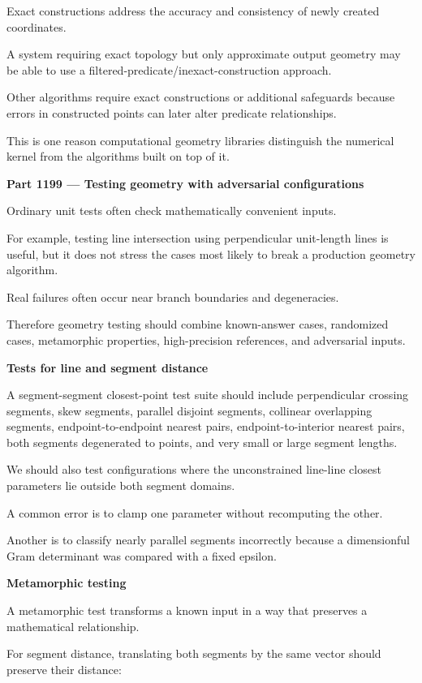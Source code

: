 Exact constructions address the accuracy and consistency of newly created coordinates.

A system requiring exact topology but only approximate output geometry may be able to use a filtered-predicate/inexact-construction approach.

Other algorithms require exact constructions or additional safeguards because errors in constructed points can later alter predicate relationships.

This is one reason computational geometry libraries distinguish the numerical kernel from the algorithms built on top of it.

\textbf{Part 1199 --- Testing geometry with adversarial configurations}

Ordinary unit tests often check mathematically convenient inputs.

For example, testing line intersection using perpendicular unit-length lines is useful, but it does not stress the cases most likely to break a production geometry algorithm.

Real failures often occur near branch boundaries and degeneracies.

Therefore geometry testing should combine known-answer cases, randomized cases, metamorphic properties, high-precision references, and adversarial inputs.

\textbf{Tests for line and segment distance}

A segment-segment closest-point test suite should include perpendicular crossing segments, skew segments, parallel disjoint segments, collinear overlapping segments, endpoint-to-endpoint nearest pairs, endpoint-to-interior nearest pairs, both segments degenerated to points, and very small or large segment lengths.

We should also test configurations where the unconstrained line-line closest parameters lie outside both segment domains.

A common error is to clamp one parameter without recomputing the other.

Another is to classify nearly parallel segments incorrectly because a dimensionful Gram determinant was compared with a fixed epsilon.

\textbf{Metamorphic testing}

A metamorphic test transforms a known input in a way that preserves a mathematical relationship.

For segment distance, translating both segments by the same vector should preserve their distance:

